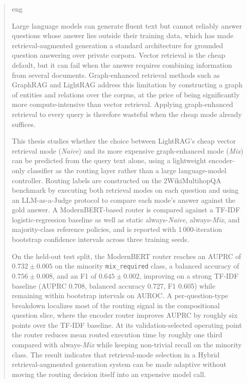 \documentclass[english, bibtex]{kththesis}               %
\numberwithin{listing}{chapter}
\begin{document}
\begin{abstract}
  \markboth{\abstractname}{}
\begin{scontents}[store-env=lang]
eng
\end{scontents}

\begin{scontents}[store-env=abstracts,print-env=true]
Large language models can generate fluent text but cannot reliably answer questions whose answer lies outside their training data, which has made retrieval-augmented generation a standard architecture for grounded question answering over private corpora. Vector retrieval is the cheap default, but it can fail when the answer requires combining information from several documents. Graph-enhanced retrieval methods such as GraphRAG and LightRAG address this limitation by constructing a graph of entities and relations over the corpus, at the price of being significantly more compute-intensive than vector retrieval. Applying graph-enhanced retrieval to every query is therefore wasteful when the cheap mode already suffices.

This thesis studies whether the choice between LightRAG's cheap vector retrieval mode (\emph{Naive}) and its more expensive graph-enhanced mode (\emph{Mix}) can be predicted from the query text alone, using a lightweight encoder-only classifier as the routing layer rather than a large language-model controller. Routing labels are constructed on the 2WikiMultihopQA benchmark by executing both retrieval modes on each question and using an LLM-as-a-Judge protocol to compare each mode's answer against the gold answer. A ModernBERT-based router is compared against a TF-IDF logistic-regression baseline as well as static always-\emph{Naive}, always-\emph{Mix}, and majority-class reference policies, and is reported with 1\,000-iteration bootstrap confidence intervals across three training seeds.

On the held-out test split, the ModernBERT router reaches an AUPRC of $0.732 \pm 0.005$ on the minority \texttt{mix\_required} class, a balanced accuracy of $0.756 \pm 0.008$, and an F1 of $0.645 \pm 0.002$, improving on a strong TF-IDF baseline (AUPRC 0.708, balanced accuracy 0.727, F1 0.605) while remaining within bootstrap intervals on AUROC. A per-question-type breakdown localizes most of the routing signal in the compositional question slice, where the encoder router improves AUPRC by roughly six points over the TF-IDF baseline. At its validation-selected operating point the router reduces mean routed execution time by roughly one third compared with always-\emph{Mix} while keeping non-trivial recall on the minority class. The result indicates that retrieval-mode selection in a Hybrid retrieval-augmented generation system can be made adaptive without moving the routing decision itself into an expensive model call.
\end{scontents}


\end{abstract}
\end{document}
